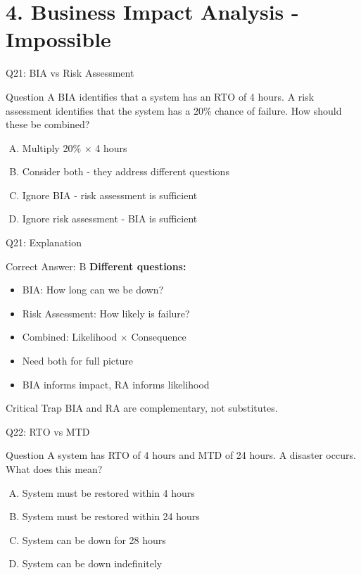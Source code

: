 \documentclass{beamer}
\begin{document}
			\section{4. Business Impact Analysis - Impossible}
			\begin{frame}{Q21: BIA vs Risk Assessment}
				\begin{block}{Question}
					A BIA identifies that a system has an RTO of 4 hours. A risk assessment identifies that the system has a 20\% chance of failure. How should these be combined?
				\end{block}
				\begin{enumerate}[(A)]
					\item Multiply 20\% $\times$ 4 hours
					\item Consider both - they address different questions
					\item Ignore BIA - risk assessment is sufficient
					\item Ignore risk assessment - BIA is sufficient
				\end{enumerate}
			\end{frame}
			
			\begin{frame}{Q21: Explanation}
				\begin{block}{Correct Answer: B}
					\textbf{Different questions:}
					\begin{itemize}
						\item BIA: How long can we be down?
						\item Risk Assessment: How likely is failure?
						\item Combined: Likelihood $\times$ Consequence
						\item Need both for full picture
						\item BIA informs impact, RA informs likelihood
					\end{itemize}
				\end{block}
				\begin{alertblock}{Critical Trap}
					BIA and RA are complementary, not substitutes.
				\end{alertblock}
			\end{frame}
			
			\begin{frame}{Q22: RTO vs MTD}
				\begin{block}{Question}
					A system has RTO of 4 hours and MTD of 24 hours. A disaster occurs. What does this mean?
				\end{block}
				\begin{enumerate}[(A)]
					\item System must be restored within 4 hours
					\item System must be restored within 24 hours
					\item System can be down for 28 hours
					\item System can be down indefinitely
				\end{enumerate}
			\end{frame}
			
\end{document}
